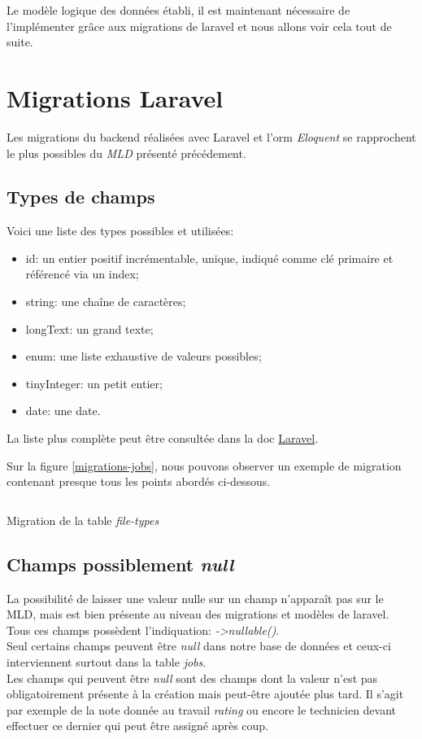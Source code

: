 \documentclass[
    iai, %
    il, %
]{heig-tb}
\begin{document}
Le modèle logique des données établi, il est maintenant nécessaire de l'implémenter grâce aux migrations de \Gls{laravel} et nous allons voir cela tout de suite.

\section{Migrations Laravel}

Les migrations du \Gls{backend} réalisées avec Laravel et l'\Gls{orm} \emph{Eloquent} se rapprochent le plus possibles du \emph{MLD} présenté précédement.

\subsection{Types de champs}
Voici une liste des types possibles et utilisées:
\begin{itemize}
    \item id: un entier positif incrémentable, unique, indiqué comme clé primaire et référencé via un index;
    \item string: une chaîne de caractères;
    \item longText: un grand texte;
    \item enum: une liste exhaustive de valeurs possibles;
    \item tinyInteger: un petit entier;
    \item date: une date.
\end{itemize}

La liste plus complète peut être consultée dans la doc \href{https://laravel.com/docs/9.x/migrations#available-column-types}{Laravel}.

Sur la figure \ref{migrations-jobs}, nous pouvons observer un exemple de migration contenant presque tous les points abordés ci-dessous.

\begin{listing}[h]
    \inputminted{php}{assets/code/16_create_jobs_table.php}
    \caption{Migration de la table \emph{file-types} \label{migrations-jobs}}
\end{listing}

\subsection{Champs possiblement \emph{null}}
La possibilité de laisser une valeur nulle sur un champ n'apparaît pas sur le MLD, mais est bien présente au niveau des migrations et modèles de \Gls{laravel}.\\
Tous ces champs possèdent l'indiquation: \emph{->nullable()}.\\
Seul certains champs peuvent être \emph{null} dans notre base de données et ceux-ci interviennent surtout dans la table \emph{jobs}.\\
Les champs qui peuvent être \emph{null} sont des champs dont la valeur n'est pas obligatoirement présente à la création mais peut-être ajoutée plus tard. Il s'agit par exemple de la note donnée au travail \emph{rating} ou encore le technicien devant effectuer ce dernier qui peut être assigné après coup.
\end{document}
